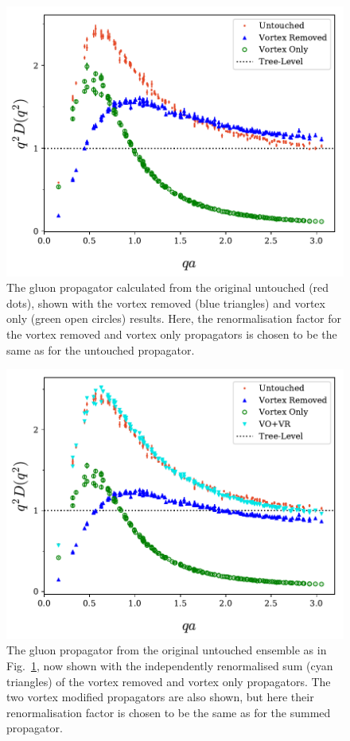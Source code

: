 \begin{figure}[tb]
\centering
\includegraphics[width=\linewidth]{./ScalarGluComp_q2_NoCoolSum.pdf}
\caption{\label{fig:NoCool}The gluon propagator calculated from the original untouched (red dots), shown with the vortex removed (blue triangles) and vortex only (green open circles) results. Here, the renormalisation factor for the vortex removed and vortex only propagators is chosen to be the same as for the untouched propagator.}
\end{figure}
%
\begin{figure}[tb]
\centering
\includegraphics[width=\linewidth]{./ScalarGluComp_q2_NoCoolSum2.pdf}
\caption{\label{fig:NoCoolSum}The gluon propagator from the original untouched ensemble as in Fig.~\ref{fig:NoCool}, now shown with the independently renormalised sum (cyan triangles) of the vortex removed and vortex only propagators. The two vortex modified propagators are also shown, but here their renormalisation factor is chosen to be the same as for the summed propagator.}
\end{figure}

